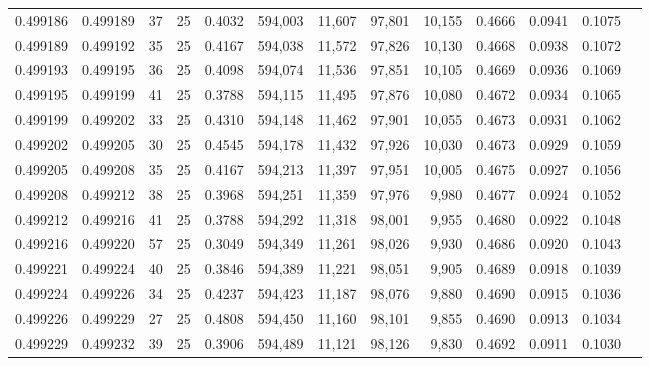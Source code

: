 \begin{tabular}{rrrrrrrrrrrrr}
0.499186 & 0.499189 &    37 &  25 &                                     0.4032 & 594,003 &  11,607 &  97,801 &  10,155 & 0.4666 & 0.0941 & 0.1075 \\
0.499189 & 0.499192 &    35 &  25 &                                     0.4167 & 594,038 &  11,572 &  97,826 &  10,130 & 0.4668 & 0.0938 & 0.1072 \\
0.499193 & 0.499195 &    36 &  25 &                                     0.4098 & 594,074 &  11,536 &  97,851 &  10,105 & 0.4669 & 0.0936 & 0.1069 \\
0.499195 & 0.499199 &    41 &  25 &                                     0.3788 & 594,115 &  11,495 &  97,876 &  10,080 & 0.4672 & 0.0934 & 0.1065 \\
0.499199 & 0.499202 &    33 &  25 &                                     0.4310 & 594,148 &  11,462 &  97,901 &  10,055 & 0.4673 & 0.0931 & 0.1062 \\
0.499202 & 0.499205 &    30 &  25 &                                     0.4545 & 594,178 &  11,432 &  97,926 &  10,030 & 0.4673 & 0.0929 & 0.1059 \\
0.499205 & 0.499208 &    35 &  25 &                                     0.4167 & 594,213 &  11,397 &  97,951 &  10,005 & 0.4675 & 0.0927 & 0.1056 \\
0.499208 & 0.499212 &    38 &  25 &                                     0.3968 & 594,251 &  11,359 &  97,976 &   9,980 & 0.4677 & 0.0924 & 0.1052 \\
0.499212 & 0.499216 &    41 &  25 &                                     0.3788 & 594,292 &  11,318 &  98,001 &   9,955 & 0.4680 & 0.0922 & 0.1048 \\
0.499216 & 0.499220 &    57 &  25 &                                     0.3049 & 594,349 &  11,261 &  98,026 &   9,930 & 0.4686 & 0.0920 & 0.1043 \\
0.499221 & 0.499224 &    40 &  25 &                                     0.3846 & 594,389 &  11,221 &  98,051 &   9,905 & 0.4689 & 0.0918 & 0.1039 \\
0.499224 & 0.499226 &    34 &  25 &                                     0.4237 & 594,423 &  11,187 &  98,076 &   9,880 & 0.4690 & 0.0915 & 0.1036 \\
0.499226 & 0.499229 &    27 &  25 &                                     0.4808 & 594,450 &  11,160 &  98,101 &   9,855 & 0.4690 & 0.0913 & 0.1034 \\
0.499229 & 0.499232 &    39 &  25 &                                     0.3906 & 594,489 &  11,121 &  98,126 &   9,830 & 0.4692 & 0.0911 & 0.1030 \\

\end{tabular}
